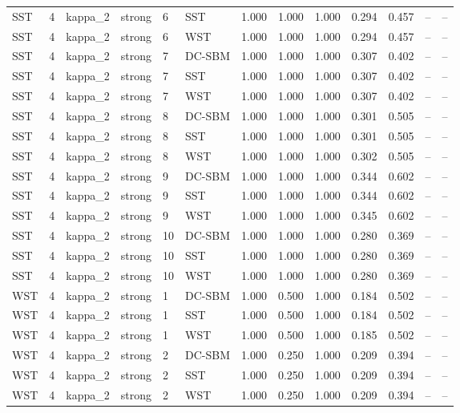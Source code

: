 \begin{table}[!h]
\begin{tabular}[t]{lllllllllllll}
SST & 4 & kappa_2 & strong & 6 & SST & 1.000 & 1.000 & 1.000 & 0.294 & 0.457 & -- & --\\
SST & 4 & kappa_2 & strong & 6 & WST & 1.000 & 1.000 & 1.000 & 0.294 & 0.457 & -- & --\\
SST & 4 & kappa_2 & strong & 7 & DC-SBM & 1.000 & 1.000 & 1.000 & 0.307 & 0.402 & -- & --\\
SST & 4 & kappa_2 & strong & 7 & SST & 1.000 & 1.000 & 1.000 & 0.307 & 0.402 & -- & --\\
SST & 4 & kappa_2 & strong & 7 & WST & 1.000 & 1.000 & 1.000 & 0.307 & 0.402 & -- & --\\
SST & 4 & kappa_2 & strong & 8 & DC-SBM & 1.000 & 1.000 & 1.000 & 0.301 & 0.505 & -- & --\\
SST & 4 & kappa_2 & strong & 8 & SST & 1.000 & 1.000 & 1.000 & 0.301 & 0.505 & -- & --\\
SST & 4 & kappa_2 & strong & 8 & WST & 1.000 & 1.000 & 1.000 & 0.302 & 0.505 & -- & --\\
SST & 4 & kappa_2 & strong & 9 & DC-SBM & 1.000 & 1.000 & 1.000 & 0.344 & 0.602 & -- & --\\
SST & 4 & kappa_2 & strong & 9 & SST & 1.000 & 1.000 & 1.000 & 0.344 & 0.602 & -- & --\\
SST & 4 & kappa_2 & strong & 9 & WST & 1.000 & 1.000 & 1.000 & 0.345 & 0.602 & -- & --\\
SST & 4 & kappa_2 & strong & 10 & DC-SBM & 1.000 & 1.000 & 1.000 & 0.280 & 0.369 & -- & --\\
SST & 4 & kappa_2 & strong & 10 & SST & 1.000 & 1.000 & 1.000 & 0.280 & 0.369 & -- & --\\
SST & 4 & kappa_2 & strong & 10 & WST & 1.000 & 1.000 & 1.000 & 0.280 & 0.369 & -- & --\\
WST & 4 & kappa_2 & strong & 1 & DC-SBM & 1.000 & 0.500 & 1.000 & 0.184 & 0.502 & -- & --\\
WST & 4 & kappa_2 & strong & 1 & SST & 1.000 & 0.500 & 1.000 & 0.184 & 0.502 & -- & --\\
WST & 4 & kappa_2 & strong & 1 & WST & 1.000 & 0.500 & 1.000 & 0.185 & 0.502 & -- & --\\
WST & 4 & kappa_2 & strong & 2 & DC-SBM & 1.000 & 0.250 & 1.000 & 0.209 & 0.394 & -- & --\\
WST & 4 & kappa_2 & strong & 2 & SST & 1.000 & 0.250 & 1.000 & 0.209 & 0.394 & -- & --\\
WST & 4 & kappa_2 & strong & 2 & WST & 1.000 & 0.250 & 1.000 & 0.209 & 0.394 & -- & --\\

\end{tabular}
\end{table}

